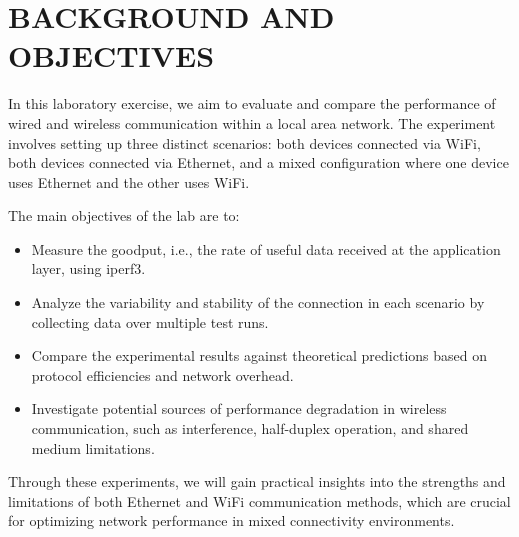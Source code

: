 
\section{BACKGROUND AND OBJECTIVES} \label{sec:background-and-objectives}


    In this laboratory exercise, we aim to evaluate and compare the performance of wired and wireless communication within a local area network. The experiment involves setting up three distinct scenarios: both devices connected via WiFi, both devices connected via Ethernet, and a mixed configuration where one device uses Ethernet and the other uses WiFi. 

    \noindent The main objectives of the lab are to:

    \begin{itemize}
        \item Measure the goodput, i.e., the rate of useful data received at the application layer, using iperf3.
        \item Analyze the variability and stability of the connection in each scenario by collecting data over multiple test runs.
        \item Compare the experimental results against theoretical predictions based on protocol efficiencies and network overhead.
        \item Investigate potential sources of performance degradation in wireless communication, such as interference, half-duplex operation, and shared medium limitations.
    \end{itemize}

    Through these experiments, we will gain practical insights into the strengths and limitations of both Ethernet and WiFi communication methods, which are crucial for optimizing network performance in mixed connectivity environments.
